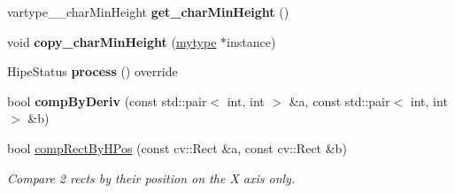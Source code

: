 \begin{DoxyCompactItemize}
\item 
\mbox{\label{classfilter_1_1algos_1_1_i_d_plate_rectifier_a9d67c76ccf32d822befeffcde951bce5}} 
vartype\+\_\+\+\_\+char\+Min\+Height {\bfseries get\+\_\+char\+Min\+Height} ()
\item 
\mbox{\label{classfilter_1_1algos_1_1_i_d_plate_rectifier_a62b2af1d610637869a428240fb87d729}} 
void {\bfseries copy\+\_\+char\+Min\+Height} (\hyperlink{classfilter_1_1algos_1_1_i_d_plate_rectifier}{mytype} $\ast$instance)
\item 
\mbox{\label{classfilter_1_1algos_1_1_i_d_plate_rectifier_ab281284363bd71920bde63d1cbed06d7}} 
Hipe\+Status {\bfseries process} () override
\item 
\mbox{\label{classfilter_1_1algos_1_1_i_d_plate_rectifier_a87e8568567a8a4cd0a2ba41d070fcf15}} 
bool {\bfseries comp\+By\+Deriv} (const std\+::pair$<$ int, int $>$ \&a, const std\+::pair$<$ int, int $>$ \&b)
\item 
bool \hyperlink{classfilter_1_1algos_1_1_i_d_plate_rectifier_af2449a3fc87c1afdb4f241b4bd5367d5}{comp\+Rect\+By\+H\+Pos} (const cv\+::\+Rect \&a, const cv\+::\+Rect \&b)
\begin{DoxyCompactList}\small\item\em Compare 2 rects by their position on the X axis only. \end{DoxyCompactList}\end{DoxyCompactItemize}
